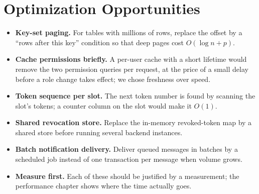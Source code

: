 \section{Optimization Opportunities}\label{sec:opt}
\begin{itemize}
\item \textbf{Key-set paging.} For tables with millions of rows, replace the offset by a ``rows after this key'' condition so that deep pages cost $O(\log n + p)$.
\item \textbf{Cache permissions briefly.} A per-user cache with a short lifetime would remove the two permission queries per request, at the price of a small delay before a role change takes effect; we chose freshness over speed.
\item \textbf{Token sequence per slot.} The next token number is found by scanning the slot's tokens; a counter column on the slot would make it $O(1)$.
\item \textbf{Shared revocation store.} Replace the in-memory revoked-token map by a shared store before running several backend instances.
\item \textbf{Batch notification delivery.} Deliver queued messages in batches by a scheduled job instead of one transaction per message when volume grows.
\item \textbf{Measure first.} Each of these should be justified by a measurement; the performance chapter shows where the time actually goes.
\end{itemize}
